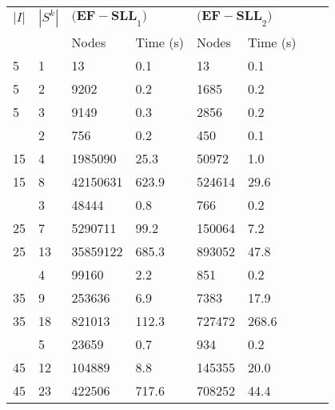 
\begin{tabularx}{\textwidth}{ll *{6}{Y}}
    \toprule
    $|I|$ & $|S^k|$
        & & \\
    \cmidrule(lr){3-4} \cmidrule(lr){5-6}
    & & Nodes & Time (s) & Nodes & Time (s)\\
      & 1  & 13       & 0.1   & 13     & 0.1\\
    5  & 2  & 9202     & 0.2   & 1685   & 0.2\\
    5  & 3  & 9149     & 0.3   & 2856   & 0.2\\
     & 2  & 756      & 0.2   & 450    & 0.1\\
    15 & 4  & 1985090  & 25.3  & 50972  & 1.0\\
    15 & 8  & 42150631 & 623.9 & 524614 & 29.6\\
     & 3  & 48444    & 0.8   & 766    & 0.2\\
    25 & 7  & 5290711  & 99.2  & 150064 & 7.2\\
    25 & 13 & 35859122 & 685.3 & 893052 & 47.8\\
     & 4  & 99160    & 2.2   & 851    & 0.2\\
    35 & 9  & 253636   & 6.9   & 7383   & 17.9\\
    35 & 18 & 821013   & 112.3 & 727472 & 268.6\\
     & 5  & 23659    & 0.7   & 934    & 0.2\\
    45 & 12 & 104889   & 8.8   & 145355 & 20.0\\
    45 & 23 & 422506   & 717.6 & 708252 & 44.4\\
    \bottomrule
\end{tabularx}
